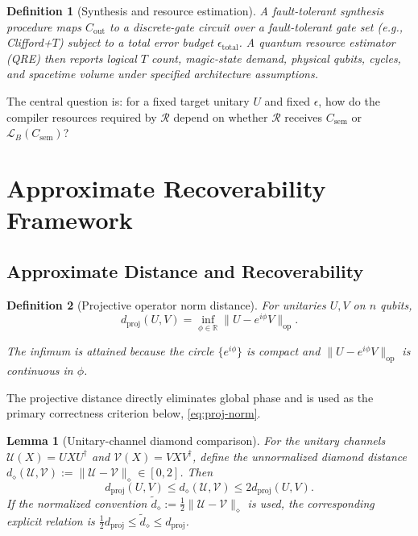\documentclass[aps,prx,reprint,floatfix,superscriptaddress]{revtex4-2}
\newtheorem{definition}{Definition}
\newtheorem{lemma}{Lemma}
\begin{document}
\begin{definition}[Synthesis and resource estimation]
\label{def:synthesis}
A fault-tolerant synthesis procedure maps $C_{\mathrm{out}}$ to a
discrete-gate circuit over a fault-tolerant gate set (e.g., Clifford+$T$)
subject to a total error budget $\epsilon_{\mathrm{total}}$. A quantum
resource estimator (QRE) then reports logical $T$ count, magic-state
demand, physical qubits, cycles, and spacetime volume under specified
architecture assumptions.
\end{definition}

The central question is: for a fixed target unitary $U$ and fixed
$\epsilon$, how do the compiler resources required by $\mathcal{R}$
depend on whether $\mathcal{R}$ receives $C_{\mathrm{sem}}$ or
$\mathcal{L}_B(C_{\mathrm{sem}})$?


\section{Approximate Recoverability Framework}
\label{sec:framework}

\subsection{Approximate Distance and Recoverability}

\begin{definition}[Projective operator norm distance]
\label{def:proj-norm}
For unitaries $U, V$ on $n$ qubits,
\begin{equation}
\label{eq:proj-norm}
  d_{\mathrm{proj}}(U, V) = \inf_{\phi \in \mathbb{R}} \|U - e^{i\phi} V\|_{\mathrm{op}}.
\end{equation}
  
The infimum is attained because the circle $\{e^{i\phi}\}$ is compact and
$\|U - e^{i\phi}V\|_{\mathrm{op}}$ is continuous in $\phi$.
\end{definition}

The projective distance directly eliminates global phase and is used as
the primary correctness criterion below, \eqref{eq:proj-norm}.

\begin{lemma}[Unitary-channel diamond comparison]
\label{lem:diamond-comparison}
For the unitary channels
$\mathcal U(X)=UXU^\dagger$ and $\mathcal V(X)=VXV^\dagger$, define the
\emph{unnormalized} diamond distance
$d_\diamond(\mathcal U,\mathcal V)
:=\|\mathcal U-\mathcal V\|_\diamond\in[0,2]$.  Then
\begin{equation*}
 d_{\mathrm{proj}}(U,V)
 \leq d_\diamond(\mathcal U,\mathcal V)
 \leq 2d_{\mathrm{proj}}(U,V).
\end{equation*}
If the normalized convention
$\widetilde d_\diamond:=\tfrac12\|\mathcal U-\mathcal V\|_\diamond$ is used,
the corresponding explicit relation is
$\tfrac12d_{\mathrm{proj}}\leq\widetilde d_\diamond\leq
d_{\mathrm{proj}}$.
\end{lemma}
\end{document}
